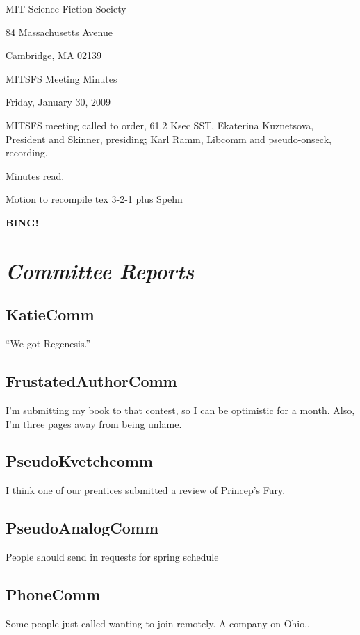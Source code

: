 \documentclass[10pt]{article}
\newcommand{\bing}{{\bf BING!} }
\newcommand{\goto}[1]{\bing \vskip 12pt \section*{{\em{#1}}}}
\newcommand{\ps}{ plus Spehn\xspace}
\begin{document}
\begin{center}

MIT Science Fiction Society

84 Massachusetts Avenue

Cambridge, MA 02139

\vspace{12pt}

MITSFS Meeting Minutes

Friday, January 30, 2009

\end{center}

\vspace{18pt}

\setlength{\parskip}{6pt}

\noindent
MITSFS meeting called to order, 61.2 Ksec SST,
Ekaterina Kuznetsova, President and Skinner, presiding; Karl Ramm, Libcomm
and pseudo-onseck, recording.

Minutes read.

Motion to recompile tex 3-2-1 \ps

\goto{Committee Reports}

\subsection*{KatieComm}
``We got Regenesis.''

\subsection*{FrustatedAuthorComm}
I'm submitting my book to that contest, so I can be optimistic for a month.
Also, I'm three pages away from being unlame.

\subsection*{PseudoKvetchcomm}
I think one of our prentices submitted a review of Princep's Fury.

\subsection*{PseudoAnalogComm}
People should send in requests for spring schedule

\subsection*{PhoneComm}
Some people just called wanting to join remotely.  A company on Ohio..
\end{document}
